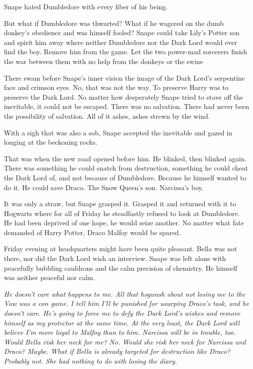 Snape hated Dumbledore with every fiber of his being.

But what if Dumbledore was thwarted? What if he wagered on the dumb donkey's obedience and was himself fooled? Snape could take Lily's Potter son and spirit him away where neither Dumbledore nor the Dark Lord would ever find the boy. Remove him from the game. Let the two power-mad sorcerers finish the war between them with no help from the donkeys or the swine{\el}

There swam before Snape's inner vision the image of the Dark Lord's serpentine face and crimson eyes. No, that was not the way. To preserve Harry was to preserve the Dark Lord. No matter how desperately Snape tried to stave off the inevitable, it could not be escaped. There was no salvation. There had never been the possibility of salvation. All of it ashes, ashes strewn by the wind.

With a sigh that was also a sob, Snape accepted the inevitable and gazed in longing at the beckoning rocks.

That was when the new road opened before him. He blinked, then blinked again. There was something he could snatch from destruction, something he could cheat the Dark Lord of, and not because of Dumbledore. Because he himself wanted to do it. He could save Draco. The Snow Queen's son. Narcissa's boy.

It was only a straw, but Snape grasped it. Grasped it and returned with it to Hogwarts where for all of Friday he steadfastly refused to look at Dumbledore. He had been deprived of one hope, he would seize another. No matter what fate demanded of Harry Potter, Draco Malfoy would be spared.

Friday evening at headquarters might have been quite pleasant. Bella was not there, nor did the Dark Lord wish an interview. Snape was left alone with peacefully bubbling cauldrons and the calm precision of chemistry. He himself was neither peaceful nor calm.

\emph{He doesn't care what happens to me. All that hogwash about not losing me to the Vow was a con game. I tell him I'll be punished for usurping Draco's task, and he doesn't care. He's going to force me to defy the Dark Lord's wishes and remove himself as my protector at the same time. At the very least, the Dark Lord will believe I'm more loyal to Malfoy than to him. Narcissa will be in trouble, too. Would Bella risk her neck for me? No. Would she risk her neck for Narcissa and Draco? Maybe. What if Bella is already targeted for destruction like Draco? Probably not. She had nothing to do with losing the diary.}

